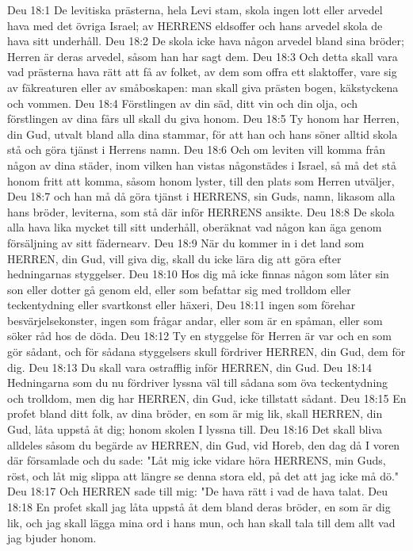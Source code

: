 Deu 18:1  De levitiska prästerna, hela Levi stam, skola ingen lott eller arvedel hava med det övriga Israel; av HERRENS eldsoffer och hans arvedel skola de hava sitt underhåll.
Deu 18:2  De skola icke hava någon arvedel bland sina bröder; Herren är deras arvedel, såsom han har sagt dem.
Deu 18:3  Och detta skall vara vad prästerna hava rätt att få av folket, av dem som offra ett slaktoffer, vare sig av fäkreaturen eller av småboskapen: man skall giva prästen bogen, käkstyckena och vommen.
Deu 18:4  Förstlingen av din säd, ditt vin och din olja, och förstlingen av dina fårs ull skall du giva honom.
Deu 18:5  Ty honom har Herren, din Gud, utvalt bland alla dina stammar, för att han och hans söner alltid skola stå och göra tjänst i Herrens namn.
Deu 18:6  Och om leviten vill komma från någon av dina städer, inom vilken han vistas någonstädes i Israel, så må det stå honom fritt att komma, såsom honom lyster, till den plats som Herren utväljer,
Deu 18:7  och han må då göra tjänst i HERRENS, sin Guds, namn, likasom alla hans bröder, leviterna, som stå där inför HERRENS ansikte.
Deu 18:8  De skola alla hava lika mycket till sitt underhåll, oberäknat vad någon kan äga genom försäljning av sitt fädernearv.
Deu 18:9  När du kommer in i det land som HERREN, din Gud, vill giva dig, skall du icke lära dig att göra efter hedningarnas styggelser.
Deu 18:10  Hos dig må icke finnas någon som låter sin son eller dotter gå genom eld, eller som befattar sig med trolldom eller teckentydning eller svartkonst eller häxeri,
Deu 18:11  ingen som förehar besvärjelsekonster, ingen som frågar andar, eller som är en spåman, eller som söker råd hos de döda.
Deu 18:12  Ty en styggelse för Herren är var och en som gör sådant, och för sådana styggelsers skull fördriver HERREN, din Gud, dem för dig.
Deu 18:13  Du skall vara ostrafflig inför HERREN, din Gud.
Deu 18:14  Hedningarna som du nu fördriver lyssna väl till sådana som öva teckentydning och trolldom, men dig har HERREN, din Gud, icke tillstatt sådant.
Deu 18:15  En profet bland ditt folk, av dina bröder, en som är mig lik, skall HERREN, din Gud, låta uppstå åt dig; honom skolen I lyssna till.
Deu 18:16  Det skall bliva alldeles såsom du begärde av HERREN, din Gud, vid Horeb, den dag då I voren där församlade och du sade: "Låt mig icke vidare höra HERRENS, min Guds, röst, och låt mig slippa att längre se denna stora eld, på det att jag icke må dö."
Deu 18:17  Och HERREN sade till mig: "De hava rätt i vad de hava talat.
Deu 18:18  En profet skall jag låta uppstå åt dem bland deras bröder, en som är dig lik, och jag skall lägga mina ord i hans mun, och han skall tala till dem allt vad jag bjuder honom.
